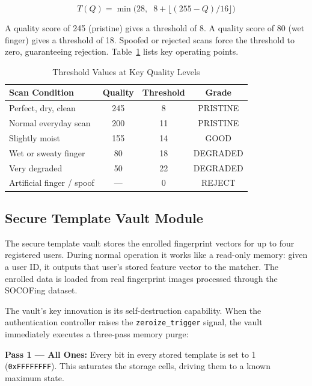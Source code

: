 \documentclass[conference]{IEEEtran}
\begin{document}
\begin{equation}
T(Q) = \min\bigl(28,\;\; 8 + \lfloor(255 - Q) / 16\rfloor\bigr)
\end{equation}

A quality score of 245 (pristine) gives a threshold of 8.
A quality score of 80 (wet finger) gives a threshold of 18.
Spoofed or rejected scans force the threshold to zero,
guaranteeing rejection. Table~\ref{tab:threshold} lists key
operating points.

\begin{table}[htbp]
\caption{Threshold Values at Key Quality Levels}
\begin{center}
\begin{tabular}{|l|c|c|c|}
\hline
\textbf{Scan Condition} & \textbf{Quality} & \textbf{Threshold} & \textbf{Grade} \\
\hline
Perfect, dry, clean      & 245 & 8  & PRISTINE \\
Normal everyday scan     & 200 & 11 & PRISTINE \\
Slightly moist           & 155 & 14 & GOOD     \\
Wet or sweaty finger     & 80  & 18 & DEGRADED \\
Very degraded            & 50  & 22 & DEGRADED \\
Artificial finger / spoof & --- & 0  & REJECT   \\
\hline
\end{tabular}
\label{tab:threshold}
\end{center}
\end{table}

\subsection{Secure Template Vault Module}

The secure template vault stores the enrolled fingerprint vectors for
up to four registered users. During normal operation it works like a
read-only memory: given a user ID, it outputs that user's stored
feature vector to the matcher. The enrolled data is loaded from
real fingerprint images processed through the SOCOFing dataset.

The vault's key innovation is its self-destruction capability. When
the authentication controller raises the \texttt{zeroize\_trigger}
signal, the vault immediately executes a three-pass memory purge:

\textbf{Pass 1 --- All Ones:} Every bit in every stored template is
set to 1 (\texttt{0xFFFFFFFF}). This saturates the storage cells,
driving them to a known maximum state.
\end{document}
